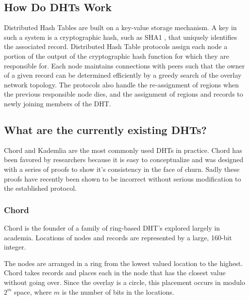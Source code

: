 	\subsection{How Do DHTs Work}
	
	Distributed Hash Tables are built on a key-value storage mechanism. 
	A key in such a system is a cryptographic hash, such as SHA1 \cite{sha}, that uniquely identifies the associated record.
	Distributed Hash Table protocols assign each node a portion of the output of the cryptographic hash function for which they are responsible for.
	Each node maintains connections with peers such that the owner of a given record can be determined efficiently by a greedy search of the overlay network topology.
	The protocols also handle the re-assignment of regions when the previous responsible node dies, and the assignment of regions and records to newly joining members of the DHT. 
	
	\subsection{What are the currently existing DHTs?}
	
	Chord and Kademlia are the most commonly used DHTs in practice. 
	Chord has been favored by researchers because it is easy to conceptualize and was designed with a series of proofs to show it's consistency in the face of churn.
	Sadly these proofs have recently been shown to be incorrect \cite{zave2012using} without serious modification to the established protocol.
	
	\subsubsection{Chord}
	
	Chord is the founder of a family of ring-based DHT's explored largely in academia.
	Locations of nodes and records are represented by a large, 160-bit integer.
	
	The nodes are arranged in a ring from the lowest valued location to the highest.
	Chord takes records and places each in the node that has the closest value without going over.
	Since the overlay is a circle, this placement occurs in modulo $2^m$ space, where $m$ is the number of bits in the locations.  
	
	
